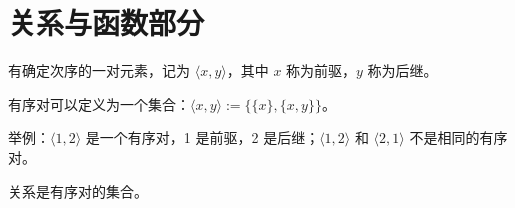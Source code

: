 \documentclass[UTF8]{ctexart}
\newcommand\Concept[1]{\colorbox{cyan!10!white}{\textcolor{cyan!40!black}{#1}}}
\newcommand\Notes[1]{\textcolor{yellow!50!black}{\small #1}}
\newcommand\Example[1]{\textcolor{cyan!70!black}{\small #1}}
\newcommand\relation[2]{\langle #1,#2 \rangle}
\newcommand\pos[1]{\marginpar{\footnotesize\ttfamily\textcolor{yellow!50!black}{\hfill #1}}}
\newcommand\defines{:=}
\begin{document}
\section{关系与函数部分}
\begin{description}[parsep=0pt]
\item[\Concept{有序对}] 有确定次序的一对元素，\pos{4.1 节}记为 $\langle x,y\rangle$，其中 $x$ 称为\Concept{前驱}，$y$ 称为\Concept{后继}。

    \Notes{有序对可以定义为一个集合：$\langle x,y\rangle \defines \{\{x\}, \{x,y\}\}$。}

    \Example{举例：$\relation{1}{2}$ 是一个有序对，1 是前驱，2 是后继；$\relation{1}{2}$ 和 $\relation{2}{1}$ 不是相同的有序对。 }
\item[\Concept{关系}] 关系是有序对的集合。\pos{4.3 节}
\end{description}
\end{document}
